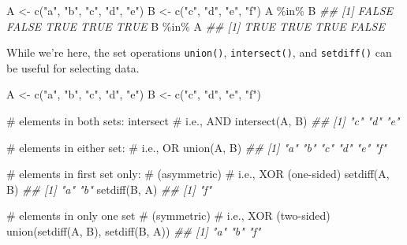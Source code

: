 \documentclass[
  13,
  letterpaper,
]{report}
\newenvironment{Shaded}{\begin{snugshade}}{\end{snugshade}}
\newcommand{\CommentTok}[1]{\textcolor[rgb]{0.37,0.37,0.37}{#1}}
\newcommand{\DocumentationTok}[1]{\textcolor[rgb]{0.37,0.37,0.37}{\textit{#1}}}
\newcommand{\FunctionTok}[1]{\textcolor[rgb]{0.28,0.35,0.67}{#1}}
\newcommand{\NormalTok}[1]{\textcolor[rgb]{0.00,0.23,0.31}{#1}}
\newcommand{\OtherTok}[1]{\textcolor[rgb]{0.00,0.23,0.31}{#1}}
\newcommand{\SpecialCharTok}[1]{\textcolor[rgb]{0.37,0.37,0.37}{#1}}
\newcommand{\StringTok}[1]{\textcolor[rgb]{0.13,0.47,0.30}{#1}}
\begin{document}
\begin{Shaded}
\begin{Highlighting}[]

\NormalTok{A }\OtherTok{\textless{}{-}} \FunctionTok{c}\NormalTok{(}\StringTok{"a"}\NormalTok{, }\StringTok{"b"}\NormalTok{, }\StringTok{"c"}\NormalTok{, }\StringTok{"d"}\NormalTok{, }\StringTok{"e"}\NormalTok{)}
\NormalTok{B }\OtherTok{\textless{}{-}} \FunctionTok{c}\NormalTok{(}\StringTok{"c"}\NormalTok{, }\StringTok{"d"}\NormalTok{, }\StringTok{"e"}\NormalTok{, }\StringTok{"f"}\NormalTok{)}
\NormalTok{A }\SpecialCharTok{\%in\%}\NormalTok{ B}
\DocumentationTok{\#\# [1] FALSE FALSE  TRUE  TRUE  TRUE}
\NormalTok{B }\SpecialCharTok{\%in\%}\NormalTok{ A}
\DocumentationTok{\#\# [1]  TRUE  TRUE  TRUE FALSE}
\end{Highlighting}
\end{Shaded}

While we're here, the set operations \texttt{union()},
\texttt{intersect()}, and \texttt{setdiff()} can be useful for selecting
data.

\begin{Shaded}
\begin{Highlighting}[]
\NormalTok{A }\OtherTok{\textless{}{-}} \FunctionTok{c}\NormalTok{(}\StringTok{"a"}\NormalTok{, }\StringTok{"b"}\NormalTok{, }\StringTok{"c"}\NormalTok{, }\StringTok{"d"}\NormalTok{, }\StringTok{"e"}\NormalTok{)}
\NormalTok{B }\OtherTok{\textless{}{-}} \FunctionTok{c}\NormalTok{(}\StringTok{"c"}\NormalTok{, }\StringTok{"d"}\NormalTok{, }\StringTok{"e"}\NormalTok{, }\StringTok{"f"}\NormalTok{)}

\CommentTok{\# elements in both sets: intersect}
\CommentTok{\# i.e., AND}
\FunctionTok{intersect}\NormalTok{(A, B)}
\DocumentationTok{\#\# [1] "c" "d" "e"}

\CommentTok{\# elements in either set:}
\CommentTok{\# i.e., OR}
\FunctionTok{union}\NormalTok{(A, B)}
\DocumentationTok{\#\# [1] "a" "b" "c" "d" "e" "f"}

\CommentTok{\# elements in first set only:}
\CommentTok{\# (asymmetric)}
\CommentTok{\# i.e., XOR (one{-}sided)}
\FunctionTok{setdiff}\NormalTok{(A, B)}
\DocumentationTok{\#\# [1] "a" "b"}
\FunctionTok{setdiff}\NormalTok{(B, A)}
\DocumentationTok{\#\# [1] "f"}

\CommentTok{\# elements in only one set}
\CommentTok{\# (symmetric)}
\CommentTok{\# i.e., XOR (two{-}sided)}
\FunctionTok{union}\NormalTok{(}\FunctionTok{setdiff}\NormalTok{(A, B), }\FunctionTok{setdiff}\NormalTok{(B, A))}
\DocumentationTok{\#\# [1] "a" "b" "f"}
\end{Highlighting}
\end{Shaded}
\end{document}
